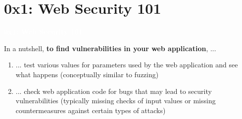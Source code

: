 \documentclass[aspectratio=169]{beamer}
\begin{document}
\section{0x1: Web Security 101}

{
\begin{frame}
\huge{\textcolor{white}{\textbf{0x1: Web Security 101}}}
\end{frame}
}

\begin{frame}
    In a nutshell, \textbf{to find vulnerabilities in your web application}, ...
    \begin{enumerate}
        \item ... test various values for parameters used by the web application and see what happens (conceptually similar to fuzzing)
        \item ... check web application code for bugs that may lead to security vulnerabilities (typically missing checks of input values or missing countermeasures against certain types of attacks)
    \end{enumerate}
\end{frame}
\end{document}
